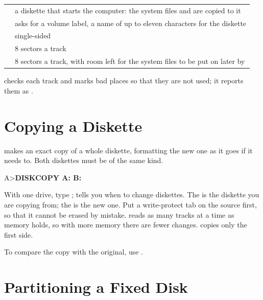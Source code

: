 \begin{tabularx}{\textwidth}{@{}P{1.6in}X@{}}
\toprule
{} & a diskette that starts the computer: the system
files and  are copied to it\\
 & asks for a volume label, a name of up to eleven
characters for the diskette\\
 & single-sided\\
 & 8 sectors a track\\
 & 8 sectors a track, with room left for the system
files to be put on later by \\
\bottomrule
\end{tabularx}

 checks each track and marks bad places so that they are not
used; it reports them as .


\section{Copying a Diskette}

 makes an exact copy of a whole diskette, formatting the
new one as it goes if it needs to. Both diskettes must be of the same
kind.

\begin{dialogue}
A>\textbf{DISKCOPY A: B:}
\end{dialogue}

With one drive, type ;  tells you when
to change diskettes. The  is the diskette you are copying
from; the  is the new one. Put a write-protect tab on the
source first, so that it cannot be erased by mistake.  reads
as many tracks at a time as memory holds, so with more memory there are
fewer changes.  copies only the first side.

To compare the copy with the original, use .

\section{Partitioning a Fixed Disk}

